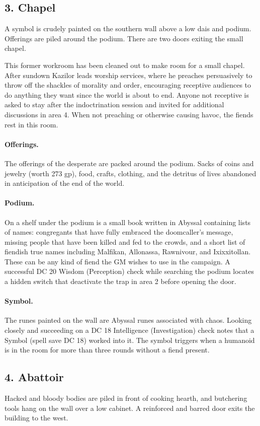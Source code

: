 \documentclass[10pt,a4paper,twoside,twocolumn,openany,bg=print,nodeprecatedcode]{dndbook}
\begin{document}
\subsection{3. Chapel}
\begin{DndReadAloud}{}
A symbol is crudely painted on the southern wall above a low dais and podium. Offerings are piled around the podium. There are two doors exiting the small chapel.
\end{DndReadAloud}

This former workroom has been cleaned out to make room for a small chapel. After sundown Kazilor leads worship services, where he preaches persuasively to throw off the shackles of morality and order, encouraging receptive audiences to do anything they want since the world is about to end. Anyone not receptive is asked to stay after the indoctrination session and invited for additional discussions in area 4. When not preaching or otherwise causing havoc, the fiends rest in this room.
\paragraph{Offerings.}
The offerings of the desperate are packed around the podium. Sacks of coins and jewelry (worth 273 gp), food, crafts, clothing, and the detritus of lives abandoned in anticipation of the end of the world.
\paragraph{Podium.}
On a shelf under the podium is a small book written in Abyssal containing lists of names: congregants that have fully embraced the doomcaller's message, missing people that have been killed and fed to the crowds, and a short list of fiendish true names including Malfikan, Allonassa, Rawnivour, and Ixixxitollan. These can be any kind of fiend the GM wishes to use in the campaign.
A successful DC 20 Wisdom (Perception) check while searching the podium locates a hidden switch that deactivate the trap in area 2 before opening the door.
\paragraph{Symbol.}
The runes painted on the wall are Abyssal runes associated with chaos. Looking closely and succeeding on a DC 18 Intelligence (Investigation) check notes that a Symbol (spell save DC 18) worked into it. The symbol triggers when a humanoid is in the room for more than three rounds without a fiend present.
\subsection{4. Abattoir}
\begin{DndReadAloud}{}
Hacked and bloody bodies are piled in front of cooking hearth, and butchering tools hang on the wall over a low cabinet. A reinforced and barred door exits the building to the west.
\end{DndReadAloud}
\end{document}
